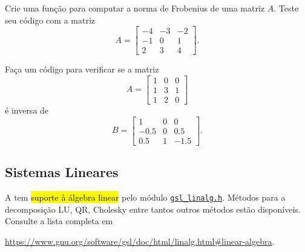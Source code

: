 \documentclass[12pt]{article}
\begin{document}
\begin{exr}
  Crie uma função para computar a norma de Frobenius de uma matriz $A$. Teste seu código com a matriz
  \begin{equation}
    A =
    \begin{bmatrix}
      -4 & -3 & -2\\
      -1 & 0 & 1\\
      2 & 3 & 4
    \end{bmatrix}.
  \end{equation}
\end{exr}

\begin{exr}
  Faça um código para verificar se a matriz
  \begin{equation}
    A =
    \begin{bmatrix}
      1 & 0 & 0\\
      1 & 3 & 1\\
      1 & 2 & 0
    \end{bmatrix}
  \end{equation}
  é inversa de
  \begin{equation}
    B =
    \begin{bmatrix}
      1 & 0 & 0\\
      -0.5 & 0 & 0.5\\
      0.5 & 1 & -1.5
    \end{bmatrix}.
  \end{equation}
\end{exr}

\subsection{Sistemas Lineares}

A {\gsl} tem \hl{suporte à álgebra linear} pelo módulo \href{https://www.gnu.org/software/gsl/doc/html/linalg.html}{\lstinline!gsl_linalg.h!}. Métodos para a decomposição LU, QR, Cholesky entre tantos outros métodos estão disponíveis. Consulte a lista completa em
\begin{center}
  \url{https://www.gnu.org/software/gsl/doc/html/linalg.html\#linear-algebra}.
\end{center}
\end{document}
